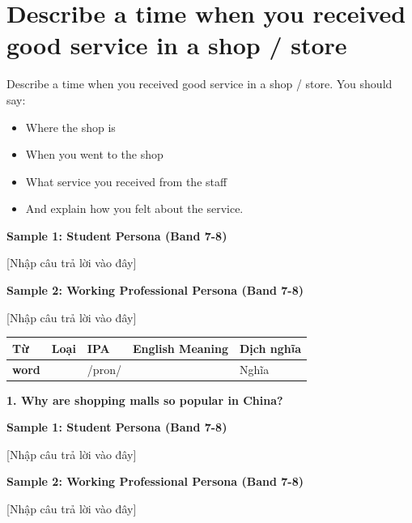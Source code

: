 \section{Describe a time when you received good service in a shop / store}
\begin{ieltsprompt}
Describe a time when you received good service in a shop / store.
You should say:
\begin{itemize}[leftmargin=2em, itemsep=2pt]
\item Where the shop is
\item When you went to the shop
\item What service you received from the staff
\item And explain how you felt about the service.
\end{itemize}
\end{ieltsprompt}
\begin{ieltsanswer}
\textbf{Sample 1: Student Persona (Band 7-8)}

[Nhập câu trả lời vào đây]

\textbf{Sample 2: Working Professional Persona (Band 7-8)}

[Nhập câu trả lời vào đây]
\end{ieltsanswer}


\vspace{0.8em}
\begin{center}
\renewcommand{\arraystretch}{1.65}
\begin{tabularx}{\textwidth}{|V{0.22\textwidth}|C{0.07\textwidth}|I{0.20\textwidth}|Y|V{0.18\textwidth}|}
\hline
{}
\textbf{Từ} & \textbf{Loại} & \textbf{IPA} & \textbf{English Meaning} & \textbf{Dịch nghĩa} \\
\hline
\textbf{word} & & /pron/ & & Nghĩa \\ \hline
\end{tabularx}
\end{center}

\partthreeheader

\begin{ieltsquestion}
\textbf{1. Why are shopping malls so popular in China?}
\end{ieltsquestion}
\textbf{Sample 1: Student Persona (Band 7-8)}

[Nhập câu trả lời vào đây]

\textbf{Sample 2: Working Professional Persona (Band 7-8)}

[Nhập câu trả lời vào đây]

